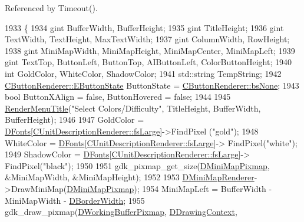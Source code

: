Referenced by Timeout().


\begin{DoxyCode}
1933                                                \{
1934     gint BufferWidth, BufferHeight;
1935     gint TitleHeight;
1936     gint TextWidth, TextHeight, MaxTextWidth;
1937     gint ColumnWidth, RowHeight;
1938     gint MiniMapWidth, MiniMapHeight, MiniMapCenter, MiniMapLeft;
1939     gint TextTop, ButtonLeft, ButtonTop, AIButtonLeft, ColorButtonHeight;
1940     \textcolor{keywordtype}{int} GoldColor, WhiteColor, ShadowColor;
1941     std::string TempString;
1942     \hyperlink{classCButtonRenderer_ae0eccda184600f6e14bfd59033e5e9a1}{CButtonRenderer::EButtonState} ButtonState = 
      \hyperlink{classCButtonRenderer_ae0eccda184600f6e14bfd59033e5e9a1aa0cd7277705307bef6c50f2250b5d62d}{CButtonRenderer::bsNone};
1943     \textcolor{keywordtype}{bool} ButtonXAlign = \textcolor{keyword}{false}, ButtonHovered = \textcolor{keyword}{false};
1944     
1945     \hyperlink{classCApplicationData_a548c5924a281c7e226fd7cac44e59920}{RenderMenuTitle}(\textcolor{stringliteral}{"Select Colors/Difficulty"}, TitleHeight, BufferWidth, BufferHeight); 
1946     
1947     GoldColor = \hyperlink{classCApplicationData_afde9247d0a3ea87393ec86dcdb1e8274}{DFonts}[\hyperlink{classCUnitDescriptionRenderer_a3ea4cd83b6dd9533ab3abb953a7da35aaf467097fe4f4811a5e2f1959c86e071d}{CUnitDescriptionRenderer::fsLarge}]->FindPixel
      (\textcolor{stringliteral}{"gold"});
1948     WhiteColor = \hyperlink{classCApplicationData_afde9247d0a3ea87393ec86dcdb1e8274}{DFonts}[\hyperlink{classCUnitDescriptionRenderer_a3ea4cd83b6dd9533ab3abb953a7da35aaf467097fe4f4811a5e2f1959c86e071d}{CUnitDescriptionRenderer::fsLarge}]->
      FindPixel(\textcolor{stringliteral}{"white"});
1949     ShadowColor = \hyperlink{classCApplicationData_afde9247d0a3ea87393ec86dcdb1e8274}{DFonts}[\hyperlink{classCUnitDescriptionRenderer_a3ea4cd83b6dd9533ab3abb953a7da35aaf467097fe4f4811a5e2f1959c86e071d}{CUnitDescriptionRenderer::fsLarge}]->
      FindPixel(\textcolor{stringliteral}{"black"});
1950     
1951     gdk\_pixmap\_get\_size(\hyperlink{classCApplicationData_abe3af81659ead5113b7b2f165a88e737}{DMiniMapPixmap}, &MiniMapWidth, &MiniMapHeight); 
1952     
1953     \hyperlink{classCApplicationData_a59b0f5dfe30ed5a54dd28aee98109e34}{DMiniMapRenderer}->DrawMiniMap(\hyperlink{classCApplicationData_abe3af81659ead5113b7b2f165a88e737}{DMiniMapPixmap});
1954     MiniMapLeft = BufferWidth - MiniMapWidth - \hyperlink{classCApplicationData_a566b69c72fa982c6ecf8e47dc21df489}{DBorderWidth};
1955     gdk\_draw\_pixmap(\hyperlink{classCApplicationData_afa34cf2780f38dd28c0c811e69d60a97}{DWorkingBufferPixmap}, \hyperlink{classCApplicationData_aa6c5bea9bdcc64398e5a3f693661d37c}{DDrawingContext}, 

\end{DoxyCode}
